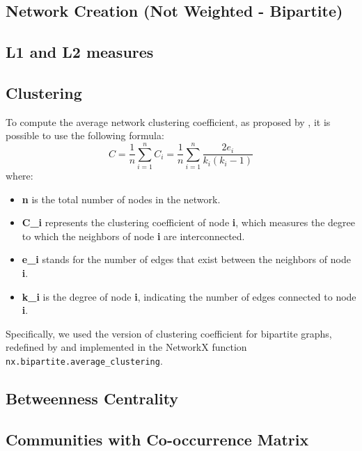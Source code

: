 
\subsection{Network Creation (Not Weighted - Bipartite)}

\subsection{L1 and L2 measures}

\subsection{Clustering}
To compute the average network clustering coefficient, as proposed by  \cite{Watts_Strogatz_1998}, it is possible to use the following
formula: 
\begin{equation}
    C = \frac{1}{n}\sum_{i = 1}^{n} C_i = \frac{1}{n}\sum_{i = 1}^{n} \frac{2e_i}{k_i(k_i-1)}
\end{equation}
where:
\begin{itemize}
    \item \textbf{n} is the total number of nodes in the network.
    \item \textbf{C\_i} represents the clustering coefficient of node \textbf{i}, which measures the degree to which the neighbors of node \textbf{i} are interconnected.
    \item \textbf{e\_i} stands for the number of edges that exist between the neighbors of node \textbf{i}.
    \item \textbf{k\_i} is the degree of node \textbf{i}, indicating the number of edges connected to node \textbf{i}.
\end{itemize}
Specifically, we used the version of clustering coefficient for bipartite graphs, redefined by  \cite{Latapy_Magnien_Vecchio_2008} and implemented
in the NetworkX function \texttt{nx.bipartite.average\_clustering}.


\subsection{Betweenness Centrality}

\subsection{Communities with Co-occurrence Matrix}


